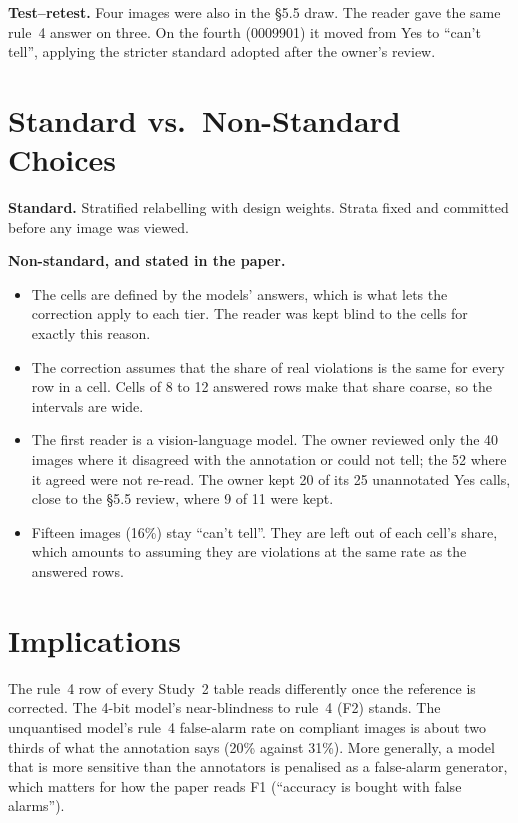 \textbf{Test--retest.} Four images were also in the \S5.5 draw. The reader gave the same rule~4 answer on
three. On the fourth (0009901) it moved from Yes to ``can't tell'', applying the stricter standard
adopted after the owner's review.

\section{Standard vs.\ Non-Standard Choices}

\textbf{Standard.} Stratified relabelling with design weights. Strata fixed and committed before any
image was viewed.

\textbf{Non-standard, and stated in the paper.}
\begin{itemize}
\item The cells are defined by the models' answers, which is what lets the correction apply to each tier.
The reader was kept blind to the cells for exactly this reason.
\item The correction assumes that the share of real violations is the same for every row in a cell. Cells
of 8 to 12 answered rows make that share coarse, so the intervals are wide.
\item The first reader is a vision-language model. The owner reviewed only the 40 images where it
disagreed with the annotation or could not tell; the 52 where it agreed were not re-read. The owner kept
20 of its 25 unannotated Yes calls, close to the \S5.5 review, where 9 of 11 were kept.
\item Fifteen images (16\%) stay ``can't tell''. They are left out of each cell's share, which amounts to
assuming they are violations at the same rate as the answered rows.
\end{itemize}

\section{Implications}

The rule~4 row of every Study~2 table reads differently once the reference is corrected. The 4-bit
model's near-blindness to rule~4 (F2) stands. The unquantised model's rule~4 false-alarm rate on
compliant images is about two thirds of what the annotation says (20\% against 31\%). More generally, a model that is more sensitive
than the annotators is penalised as a false-alarm generator, which matters for how the paper reads F1
(``accuracy is bought with false alarms'').
